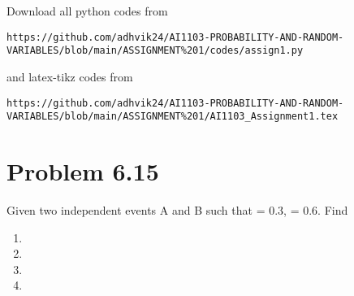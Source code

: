 \documentclass[journal,12pt,twocolumn]{IEEEtran}
\begin{document}
\maketitle
\newpage
\bigskip
\renewcommand{\thefigure}{\theenumi}
\renewcommand{\thetable}{\theenumi}
Download all python codes from 
\begin{lstlisting}
https://github.com/adhvik24/AI1103-PROBABILITY-AND-RANDOM-VARIABLES/blob/main/ASSIGNMENT%201/codes/assign1.py
\end{lstlisting}
%
and latex-tikz codes from 
%
\begin{lstlisting}
https://github.com/adhvik24/AI1103-PROBABILITY-AND-RANDOM-VARIABLES/blob/main/ASSIGNMENT%201/AI1103_Assignment1.tex
\end{lstlisting}
\section{Problem 6.15}
Given two independent events A and B such
that  = 0.3,  = 0.6. Find
\begin{enumerate}[label={\roman*)}]
    \item {}
    \item {}
    \item {}
    \item {}
\end{enumerate}
\end{document}

